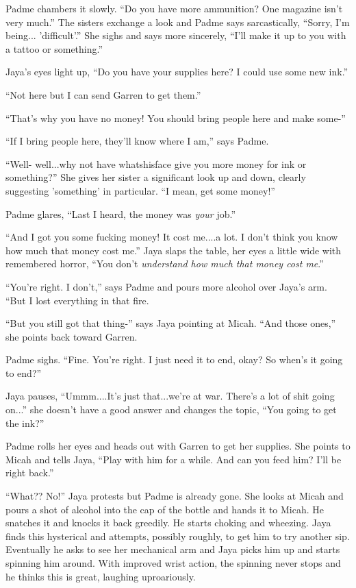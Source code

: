 Padme chambers it slowly.  ``Do you have more ammunition?  One magazine isn't very much.''  The sisters exchange a look and Padme says sarcastically, ``Sorry, I'm being... 'difficult'.''  She sighs and says more sincerely, ``I'll make it up to you with a tattoo or something.''

Jaya's eyes light up, ``Do you have your supplies here?  I could use some new ink.''

``Not here but I can send Garren to get them.''

``That's why you have no money!  You should bring people here and make some-''

``If I bring people here, they'll know where I am,'' says Padme.

``Well- well...why not have whatshisface give you more money for ink or something?'' She gives her sister a significant look up and down, clearly suggesting 'something' in particular.  ``I mean, get some money!''

Padme glares, ``Last I heard, the money was \textit{your} job.''

``And I got you some fucking money!  It cost me....a lot.  I don't think you know how much that money cost me.''  Jaya slaps the table, her eyes a little wide with remembered horror, ``You don't \textit{understand how much that money cost me}.''

``You're right.  I don't,'' says Padme and pours more alcohol over Jaya's arm. ``But I lost everything in that fire.

``But you still got that thing-'' says Jaya pointing at Micah.  ``And those ones,'' she points back toward Garren.

Padme sighs.  ``Fine.  You're right.  I just need it to end, okay?  So when's it going to end?''

Jaya pauses, ``Ummm....It's just that...we're at war.  There's a lot of shit going on...'' she doesn't have a good answer and changes the topic, ``You going to get the ink?''

Padme rolls her eyes and heads out with Garren to get her supplies.  She points to Micah and tells Jaya, ``Play with him for a while.  And can you feed him?  I'll be right back.''

``What??  No!''  Jaya protests but Padme is already gone.  She looks at Micah and pours a shot of alcohol into the cap of the bottle and hands it to Micah.  He snatches it and knocks it back greedily.  He starts choking and wheezing.  Jaya finds this hysterical and attempts, possibly roughly, to get him to try another sip.  Eventually he asks to see her mechanical arm and Jaya picks him up and starts spinning him around.  With improved wrist action, the spinning never stops and he thinks this is great, laughing uproariously.



